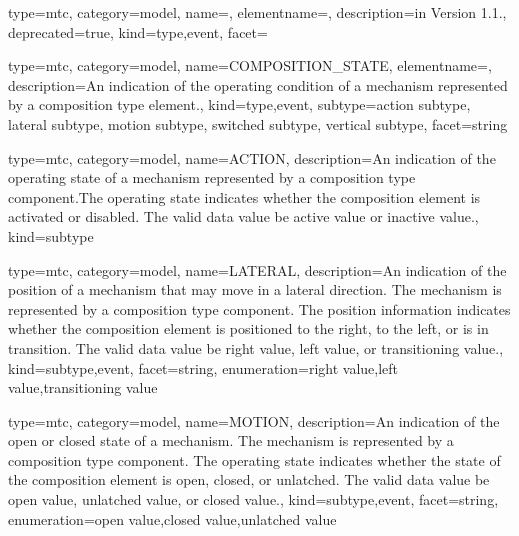 {
  type=mtc,
  category=model,
  name=,
  elementname=,
  description={\DEPRECATED in Version 1.1.},
  deprecated={true},
  kind={type,event},
  facet={}
}


{
  type=mtc,
  category=model,
  name={COMPOSITION\_STATE},
  elementname=,
  description={An indication of the operating condition of a mechanism represented by a \gls{composition} type element.},
  kind={type,event},
  subtype={\gls{action subtype}, \gls{lateral subtype}, \gls{motion subtype}, \gls{switched subtype}, \gls{vertical subtype}},
  facet={\gls{string}}
}


{
  type=mtc,
  category=model,
  name={ACTION},
  description={An indication of the operating state of a mechanism represented by a \gls{composition} type component.The operating state indicates whether the \gls{composition} element is activated or disabled. The \gls{valid data value} \must be \gls{active value} or \gls{inactive value}.},
  kind={subtype}
}


{
  type=mtc,
  category=model,
  name={LATERAL},
  description={An indication of the position of a mechanism that may move in a lateral direction.   The mechanism is represented by a \gls{composition} type component. \newline The position information indicates whether the \gls{composition} element is positioned to the right, to the left, or is in transition.  \newline The \gls{valid data value} \must be \gls{right value}, \gls{left value}, or \gls{transitioning value}.},
  kind={subtype,event},
  facet={\gls{string}},
  enumeration={\gls{right value},\gls{left value},\gls{transitioning value}}
}


{
  type=mtc,
  category=model,
  name={MOTION},
  description={An indication of the open or closed state of a mechanism.   The mechanism is represented by a \gls{composition} type component. \newline The operating state indicates whether the state of the \gls{composition} element is open, closed, or unlatched.   \newline The \gls{valid data value} \must be \gls{open value}, \gls{unlatched value}, or \gls{closed value}.},
  kind={subtype,event},
  facet={\gls{string}},
  enumeration={\gls{open value},\gls{closed value},\gls{unlatched value}}
}


